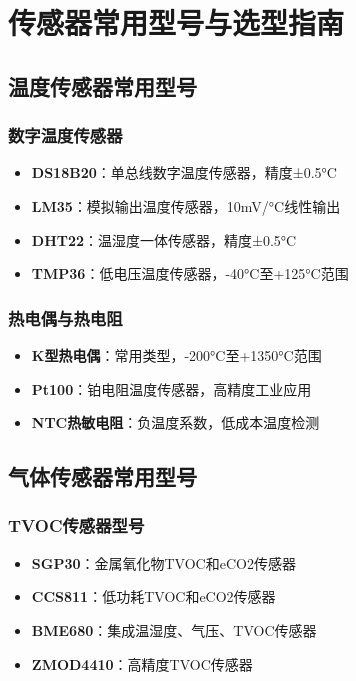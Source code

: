 \documentclass[12pt,UTF8]{ctexbook}
\begin{document}
\chapter{传感器常用型号与选型指南}
\section{温度传感器常用型号}
\subsection{数字温度传感器}
\begin{itemize}[leftmargin=2cm]
	\item \textbf{DS18B20}：单总线数字温度传感器，精度±0.5°C
	\item \textbf{LM35}：模拟输出温度传感器，10mV/°C线性输出
	\item \textbf{DHT22}：温湿度一体传感器，精度±0.5°C
	\item \textbf{TMP36}：低电压温度传感器，-40°C至+125°C范围
\end{itemize}

\subsection{热电偶与热电阻}
\begin{itemize}[leftmargin=2cm]
	\item \textbf{K型热电偶}：常用类型，-200°C至+1350°C范围
	\item \textbf{Pt100}：铂电阻温度传感器，高精度工业应用
	\item \textbf{NTC热敏电阻}：负温度系数，低成本温度检测
\end{itemize}

\section{气体传感器常用型号}
\subsection{TVOC传感器型号}
\begin{itemize}[leftmargin=2cm]
	\item \textbf{SGP30}：金属氧化物TVOC和eCO2传感器
	\item \textbf{CCS811}：低功耗TVOC和eCO2传感器
	\item \textbf{BME680}：集成温湿度、气压、TVOC传感器
	\item \textbf{ZMOD4410}：高精度TVOC传感器
\end{itemize}
\end{document}
